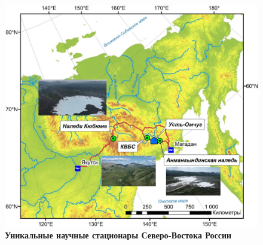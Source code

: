 \begin{figure}[h!]
\begin{changemargin}{-0.5cm}{0cm}
  \begin{center}
    \includegraphics[width=1.1\textwidth]{authors/zemlaykova-2-fig.jpg}
  \end{center}
\end{changemargin}
  \caption*{\textbf{Уникальные научные стационары Северо-Востока России}}
  \label{fig:zemlaykova-2-fig}
\end{figure}
